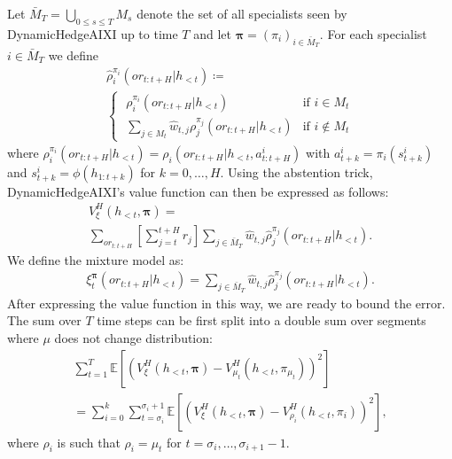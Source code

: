 \documentclass[letterpaper]{article} %
\newcommand {\E}{\mathbb{E}}
\theoremstyle{definition}
\begin{document}

Let $\bar{M}_T = \bigcup_{0\leq s \leq T} M_s$ denote the set of all specialists seen by DynamicHedgeAIXI up to time $T$ and let $\bm{\pi} = (\pi_i)_{i \in \bar{M}_T}$. For each specialist $i \in \bar{M}_T$ we define
\begin{multline*}
    \hat{\rho}^{\pi_i}_i(or_{t:t+H} | h_{<t}) \coloneqq \\
        \begin{cases}
            \; \rho_i^{\pi_i}(or_{t:t+H} | h_{<t}) &\text{if $i \in M_t$}\\
            \; \sum_{j \in M_t} \hat{w}_{t, j} \rho_j^{\pi_j}(or_{t:t+H} | h_{<t}) &\text{if $i \notin M_t$}
        \end{cases}
\end{multline*}
where $\rho_i^{\pi_i}(or_{t:t+H} | h_{<t}) = \rho_i(or_{t:t+H} | h_{<t}, a^{i}_{t:t+H})$ with $a^{i}_{t+k} = \pi_i(s^{i}_{t+k})$ and $s^{i}_{t+k} = \phi(h_{1:t+k})$ for $k = 0, \ldots, H$.
Using the abstention trick, DynamicHedgeAIXI's value function can then be expressed as follows:
\begin{multline*}
V_{\xi}^{H}(h_{<t}, \bm{\pi}) = \\
\sum_{or_{t:t+H}} \left[ \sum_{j=t}^{t+H} r_j \right] \sum_{j \in \bar{M}_T} \hat{w}_{t, j} \hat{\rho}^{\pi_j}_j(or_{t:t+H} | h_{<t}).
\end{multline*}
We define the mixture model as:
\begin{align*}
    \xi^{\bm{\pi}}_t(or_{t:t+H} | h_{<t}) = \sum_{j \in \bar{M}_T} \hat{w}_{t, j} \hat{\rho}^{\pi_j}_j(or_{t:t+H} | h_{<t}).
\end{align*}
After expressing the value function in this way, we are ready to bound the error. The sum over $T$ time steps can be first split into a double sum over segments where $\mu$ does not change distribution:
\begin{multline*}
    \sum_{t=1}^{T} \E \left[ \left( V_{\xi}^{H}(h_{<t}, \bm{\pi}) - V_{\mu_{t}}^{H}(h_{<t}, \pi_{\mu_t}) \right)^2 \right] \\
    = \sum_{i=0}^{k} \sum_{t=\sigma_i}^{\sigma_i + 1} \E \left[ \left(V_{\xi}^{H}(h_{<t}, \bm{\pi}) - V_{\rho_i}^{H}(h_{<t}, \pi_i)\right)^2 \right],
\end{multline*}
where $\rho_i$ is such that $\rho_i = \mu_t$ for $t = \sigma_i, \ldots, \sigma_{i+1}-1$.
\end{document}
